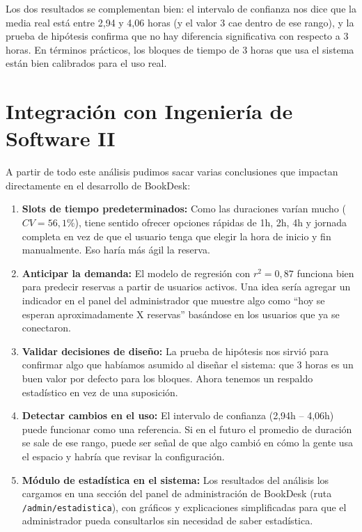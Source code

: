 \documentclass[12pt,a4paper]{article}
\begin{document}
Los dos resultados se complementan bien: el intervalo de confianza nos dice que la media real está entre 2,94 y 4,06 horas (y el valor 3 cae dentro de ese rango), y la prueba de hipótesis confirma que no hay diferencia significativa con respecto a 3 horas. En términos prácticos, los bloques de tiempo de 3 horas que usa el sistema están bien calibrados para el uso real.

\section{Integración con Ingeniería de Software II}

A partir de todo este análisis pudimos sacar varias conclusiones que impactan directamente en el desarrollo de BookDesk:

\begin{enumerate}[itemsep=10pt]
  \item \textbf{Slots de tiempo predeterminados:} Como las duraciones varían mucho ($CV = 56{,}1\%$), tiene sentido ofrecer opciones rápidas de 1h, 2h, 4h y jornada completa en vez de que el usuario tenga que elegir la hora de inicio y fin manualmente. Eso haría más ágil la reserva.

  \item \textbf{Anticipar la demanda:} El modelo de regresión con $r^2 = 0{,}87$ funciona bien para predecir reservas a partir de usuarios activos. Una idea sería agregar un indicador en el panel del administrador que muestre algo como ``hoy se esperan aproximadamente X reservas'' basándose en los usuarios que ya se conectaron.

  \item \textbf{Validar decisiones de diseño:} La prueba de hipótesis nos sirvió para confirmar algo que habíamos asumido al diseñar el sistema: que 3 horas es un buen valor por defecto para los bloques. Ahora tenemos un respaldo estadístico en vez de una suposición.

  \item \textbf{Detectar cambios en el uso:} El intervalo de confianza (2,94h – 4,06h) puede funcionar como una referencia. Si en el futuro el promedio de duración se sale de ese rango, puede ser señal de que algo cambió en cómo la gente usa el espacio y habría que revisar la configuración.

  \item \textbf{Módulo de estadística en el sistema:} Los resultados del análisis los cargamos en una sección del panel de administración de BookDesk (ruta \texttt{/admin/estadistica}), con gráficos y explicaciones simplificadas para que el administrador pueda consultarlos sin necesidad de saber estadística.
\end{enumerate}
\end{document}
